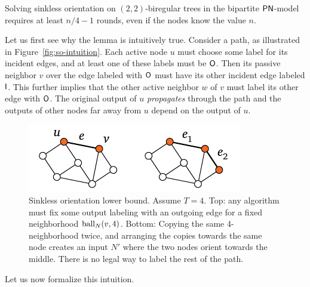 \begin{lemma} \label{lem:so-hard-paths}
	Solving sinkless orientation on $(2,2)$-biregular trees in the bipartite $\textup{\sffamily PN}$-model requires at least $n/4-1$ rounds, even if the nodes know the value $n$.  
\end{lemma}

Let us first see why the lemma is intuitively true. Consider a path, as illustrated in Figure~\ref{fig:so-intuition}. Each active node $u$ must choose some label for its incident edges, and at least one of these labels must be $\mathsf{O}$. Then its passive neighbor $v$ over the edge labeled with $\mathsf{O}$ must have its other incident edge labeled $\mathsf{I}$. This further implies that the other active neighbor $w$ of $v$ must label its other edge with $\mathsf{O}$. The original output of $u$ \emph{propagates} through the path and the outputs of other nodes far away from $u$ depend on the output of $u$.

\begin{figure}
	\centering
	\includegraphics[page=\PSOPathLBConstruction,scale=0.4]{figs.pdf}
	\caption{Sinkless orientation lower bound. Assume $T = 4$. Top: any algorithm must fix some output labeling with an outgoing edge for a fixed neighborhood $\operatorname{ball}_N(v,4)$. Bottom: Copying the same 4-neighborhood twice, and arranging the copies towards the same node creates an input $N'$ where the two nodes orient towards the middle. There is no legal way to label the rest of the path.} \label{fig:so-path-lb}
\end{figure}

Let us now formalize this intuition.

